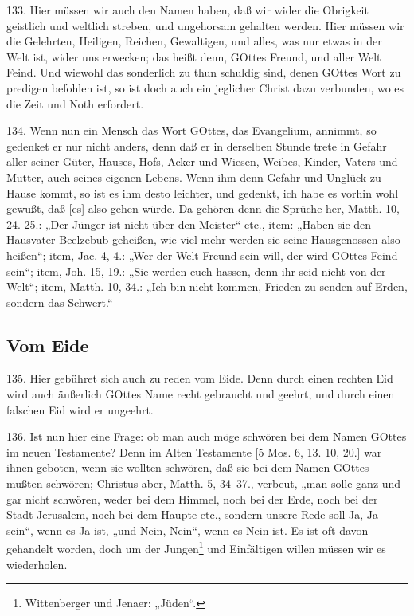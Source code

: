 133. Hier müssen wir auch den Namen haben, daß wir wider die Obrigkeit geistlich und weltlich streben, und ungehorsam gehalten werden. Hier müssen wir die Gelehrten, Heiligen, Reichen, Gewaltigen, und alles, was nur etwas in der Welt ist, wider uns erwecken; das heißt denn, GOttes Freund, und aller Welt Feind. Und wiewohl das sonderlich zu thun schuldig sind, denen GOttes Wort zu predigen befohlen ist, so ist doch auch ein jeglicher Christ dazu verbunden, wo es die Zeit und Noth erfordert.

134. Wenn nun ein Mensch das Wort GOttes, das Evangelium, annimmt, so gedenket er nur nicht anders, denn daß er in derselben Stunde trete in Gefahr aller seiner Güter, Hauses, Hofs, Acker und Wiesen, Weibes, Kinder, Vaters und Mutter, auch seines eigenen Lebens. Wenn ihm denn Gefahr und Unglück zu Hause kommt, so ist es ihm desto leichter, und gedenkt, ich habe es vorhin wohl gewußt, daß [es] also gehen würde. Da gehören denn die Sprüche her, Matth. 10, 24. 25.: „Der Jünger ist nicht über den Meister“ etc., item: „Haben sie den Hausvater Beelzebub geheißen, wie viel mehr werden sie seine Hausgenossen also heißen“; item, Jac. 4, 4.: „Wer der Welt Freund sein will, der wird GOttes Feind sein“; item, Joh. 15, 19.: „Sie werden euch hassen, denn ihr seid nicht von der Welt“; item, Matth. 10, 34.: „Ich bin nicht kommen, Frieden zu senden auf Erden, sondern das Schwert.“

\subsection{Vom Eide}

135. Hier gebühret sich auch zu reden vom Eide. Denn durch einen rechten Eid wird auch äußerlich GOttes Name recht gebraucht und geehrt, und durch einen falschen Eid wird er ungeehrt.

136. Ist nun hier eine Frage: ob man auch möge schwören bei dem Namen GOttes im
neuen Testamente? Denn im Alten Testamente [5 Mos. 6, 13. 10, 20.] war ihnen geboten, wenn sie wollten schwören, daß sie bei dem Namen GOttes mußten schwören; Christus aber, Matth. 5, 34–37., verbeut, „man solle ganz und gar nicht schwören, weder bei dem Himmel, noch bei der Erde, noch bei der Stadt Jerusalem, noch bei dem Haupte etc., sondern unsere Rede soll Ja, Ja sein“, wenn es Ja ist, „und Nein, Nein“, wenn es Nein ist. Es ist oft davon gehandelt worden, doch um der Jungen\footnote{Wittenberger und Jenaer: „Jüden“.} und Einfältigen willen müssen wir es wiederholen.

